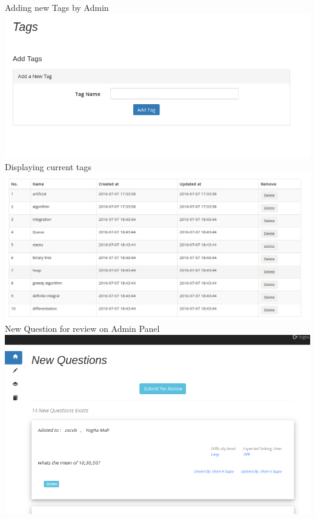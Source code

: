 \documentclass[a4paper,12pt,oneside]{book}
\begin{document}
\vspace{1in}
Adding new Tags by Admin\\
\includegraphics[scale=0.45]{tags.png}	\\

\vspace{2in}
Displaying current tags \\
\includegraphics[scale=0.3]{tags2.png}	\\

\vspace{0.7in}
New Question for review on Admin Panel \\
\includegraphics[scale=0.35]{newquestions.png}	\\
\end{document}

